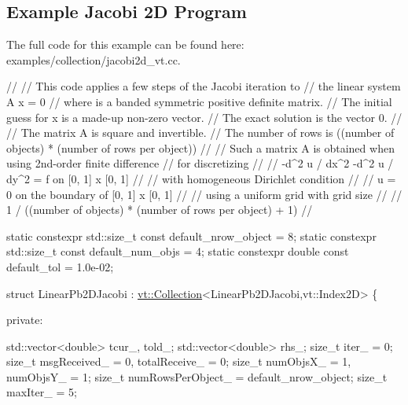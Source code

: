 \hypertarget{jacobi2d-example}{}\subsection{Example Jacobi 2D Program}\label{jacobi2d-example}
The full code for this example can be found here\+: {\ttfamily examples/collection/jacobi2d\+\_\+vt.\+cc}.


\begin{DoxyCodeInclude}

\textcolor{comment}{//}
\textcolor{comment}{// This code applies a few steps of the Jacobi iteration to}
\textcolor{comment}{// the linear system  A x = 0}
\textcolor{comment}{// where is a banded symmetric positive definite matrix.}
\textcolor{comment}{// The initial guess for x is a made-up non-zero vector.}
\textcolor{comment}{// The exact solution is the vector 0.}
\textcolor{comment}{//}
\textcolor{comment}{// The matrix A is square and invertible.}
\textcolor{comment}{// The number of rows is ((number of objects) * (number of rows per object))}
\textcolor{comment}{//}
\textcolor{comment}{// Such a matrix A is obtained when using 2nd-order finite difference}
\textcolor{comment}{// for discretizing}
\textcolor{comment}{//}
\textcolor{comment}{// -d^2 u / dx^2 -d^2 u / dy^2 = f   on  [0, 1] x [0, 1]}
\textcolor{comment}{//}
\textcolor{comment}{// with homogeneous Dirichlet condition}
\textcolor{comment}{//}
\textcolor{comment}{// u = 0 on the boundary of [0, 1] x [0, 1]}
\textcolor{comment}{//}
\textcolor{comment}{// using a uniform grid with grid size}
\textcolor{comment}{//}
\textcolor{comment}{// 1 / ((number of objects) * (number of rows per object) + 1)}
\textcolor{comment}{//}


\textcolor{keyword}{static} constexpr std::size\_t \textcolor{keyword}{const} default\_nrow\_object = 8;
\textcolor{keyword}{static} constexpr std::size\_t \textcolor{keyword}{const} default\_num\_objs = 4;
\textcolor{keyword}{static} constexpr \textcolor{keywordtype}{double} \textcolor{keyword}{const} default\_tol = 1.0e-02;


\textcolor{keyword}{struct }LinearPb2DJacobi : \hyperlink{structvt_1_1vrt_1_1collection_1_1_collection}{vt::Collection}<LinearPb2DJacobi,vt::Index2D> \{

\textcolor{keyword}{private}:

  std::vector<double> tcur\_, told\_;
  std::vector<double> rhs\_;
  \textcolor{keywordtype}{size\_t} iter\_ = 0;
  \textcolor{keywordtype}{size\_t} msgReceived\_ = 0, totalReceive\_ = 0;
  \textcolor{keywordtype}{size\_t} numObjsX\_ = 1, numObjsY\_ = 1;
  \textcolor{keywordtype}{size\_t} numRowsPerObject\_ = default\_nrow\_object;
  \textcolor{keywordtype}{size\_t} maxIter\_ = 5;


\end{DoxyCodeInclude}

